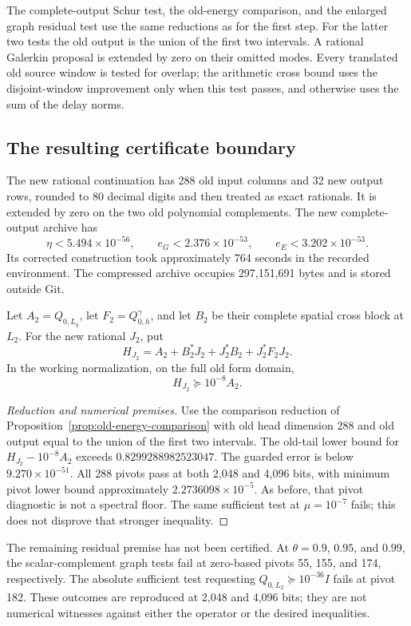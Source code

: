 The complete-output Schur test, the old-energy comparison, and the enlarged
graph residual test use the same reductions as for the first step.
For the latter two tests the old output is the union of the first two
intervals. A rational Galerkin proposal is extended by zero on their omitted
modes. Every translated old source window is tested for overlap; the
arithmetic cross bound uses the disjoint-window improvement only when this
test passes, and otherwise uses the sum of the delay norms.

\subsection{The resulting certificate boundary}
\label{sec:second-result}
The new rational continuation has 288 old input columns and 32 new output
rows, rounded to 80 decimal digits and then treated as exact rationals.
It is extended by zero on the two old polynomial complements. The new
complete-output archive has
\[
 \eta<5.494\times10^{-56},\qquad
 e_G<2.376\times10^{-53},\qquad e_E<3.202\times10^{-53}.
\]
Its corrected construction took approximately 764 seconds in the recorded
environment. The compressed archive occupies 297,151,691 bytes and is
stored outside Git.

\begin{proposition}
Let \(A_2=Q_{0,L_q}\), let \(F_2=Q^\gamma_{0,h}\), and let \(B_2\) be their
complete spatial cross block at \(L_2\). For the new rational \(J_2\), put
\[
 H_{J_2}=A_2+B_2^*J_2+J_2^*B_2+J_2^*F_2J_2.
\]
In the working normalization, on the full old form domain,
\[
 H_{J_2}\succeq10^{-8}A_2.
\]
\end{proposition}
\begin{proof}[Reduction and numerical premises]
Use the comparison reduction of Proposition~\ref{prop:old-energy-comparison}
with old head dimension 288 and old output equal to the union of the first
two intervals. The old-tail lower bound for
\(H_{J_2}-10^{-8}A_2\) exceeds \(0.8299288982523047\).
The guarded error is below \(9.270\times10^{-51}\).
All 288 pivots pass at both 2,048 and 4,096 bits, with minimum pivot lower
bound approximately \(2.2736098\times10^{-5}\). As before, that pivot
diagnostic is not a spectral floor. The same sufficient test at
\(\mu=10^{-7}\) fails; this does not disprove that stronger inequality.
\end{proof}

The remaining residual premise has not been certified. At \(\theta=0.9\),
\(0.95\), and \(0.99\), the scalar-complement graph tests fail at zero-based
pivots 55, 155, and 174, respectively. The absolute sufficient test requesting
\(Q_{0,L_2}\succeq10^{-36}I\) fails at pivot 182. These outcomes are reproduced
at 2,048 and 4,096 bits; they are not numerical witnesses against either the
operator or the desired inequalities.

